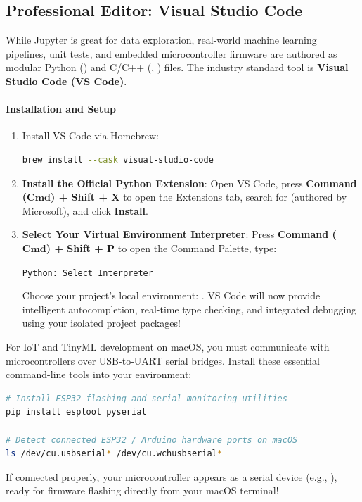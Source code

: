 \subsection{Professional Editor: Visual Studio Code}

While Jupyter is great for data exploration, real-world machine learning pipelines, unit tests, and embedded microcontroller firmware are authored as modular Python () and C/C++ (, ) files. The industry standard tool is \textbf{Visual Studio Code (VS Code)}.

\paragraph{Installation and Setup}
\begin{enumerate}
    \item Install VS Code via Homebrew:
\begin{lstlisting}[language=bash]
brew install --cask visual-studio-code
\end{lstlisting}

    \item \textbf{Install the Official Python Extension}:
    Open VS Code, press \textbf{Command ($\textbf{Cmd}$) + Shift + X} to open the Extensions tab, search for  (authored by Microsoft), and click \textbf{Install}.

    \item \textbf{Select Your Virtual Environment Interpreter}:
    Press \textbf{Command ($\textbf{Cmd}$) + Shift + P} to open the Command Palette, type:
    \begin{center}
    \texttt{Python: Select Interpreter}
    \end{center}
    Choose your project's local environment: . VS Code will now provide intelligent autocompletion, real-time type checking, and integrated debugging using your isolated project packages!
\end{enumerate}

\begin{iotbox}
For IoT and TinyML development on macOS, you must communicate with microcontrollers over USB-to-UART serial bridges. Install these essential command-line tools into your environment:
\begin{lstlisting}[language=bash]
# Install ESP32 flashing and serial monitoring utilities
pip install esptool pyserial

# Detect connected ESP32 / Arduino hardware ports on macOS
ls /dev/cu.usbserial* /dev/cu.wchusbserial*
\end{lstlisting}
If connected properly, your microcontroller appears as a serial device (e.g., ), ready for firmware flashing directly from your macOS terminal!
\end{iotbox}

